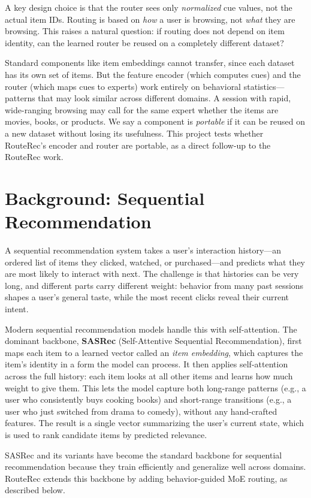 \documentclass{article}
\begin{document}
A key design choice is that the router sees only \emph{normalized} cue values, not the actual item IDs. Routing is based on \emph{how} a user is browsing, not \emph{what} they are browsing. This raises a natural question: if routing does not depend on item identity, can the learned router be reused on a completely different dataset?

Standard components like item embeddings cannot transfer, since each dataset has its own set of items. But the feature encoder (which computes cues) and the router (which maps cues to experts) work entirely on behavioral statistics---patterns that may look similar across different domains. A session with rapid, wide-ranging browsing may call for the same expert whether the items are movies, books, or products. We say a component is \emph{portable} if it can be reused on a new dataset without losing its usefulness. This project tests whether RouteRec's encoder and router are portable, as a direct follow-up to the RouteRec work.

\section{Background: Sequential Recommendation}

A sequential recommendation system takes a user's interaction history---an ordered list of items they clicked, watched, or purchased---and predicts what they are most likely to interact with next. The challenge is that histories can be very long, and different parts carry different weight: behavior from many past sessions shapes a user's general taste, while the most recent clicks reveal their current intent.

Modern sequential recommendation models handle this with self-attention. The dominant backbone, \textbf{SASRec} (Self-Attentive Sequential Recommendation), first maps each item to a learned vector called an \emph{item embedding}, which captures the item's identity in a form the model can process. It then applies self-attention across the full history: each item looks at all other items and learns how much weight to give them. This lets the model capture both long-range patterns (e.g., a user who consistently buys cooking books) and short-range transitions (e.g., a user who just switched from drama to comedy), without any hand-crafted features. The result is a single vector summarizing the user's current state, which is used to rank candidate items by predicted relevance.

SASRec and its variants have become the standard backbone for sequential recommendation because they train efficiently and generalize well across domains. RouteRec extends this backbone by adding behavior-guided MoE routing, as described below.
\end{document}
